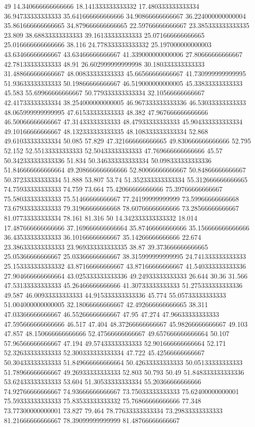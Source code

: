 49 14.340666666666666 18.141333333333332 17.480333333333334 36.94733333333333 35.641666666666666 34.90866666666667 36.224000000000004 35.861666666666665 34.879666666666665 22.59766666666667 23.385333333333335 23.809 38.68833333333333 39.16133333333333 25.071666666666665 25.016666666666666 38.116 24.778333333333332 25.197000000000003 43.63466666666667 43.63466666666667 41.339000000000006 27.80666666666667 42.78133333333333 48.91 26.602999999999998 30.180333333333333 31.488666666666667 48.00833333333333 45.66566666666667 41.730999999999995 51.93633333333333 50.19866666666667 46.519000000000005 45.33833333333333 45.583 55.69966666666667 50.779333333333334 32.10566666666667 42.41733333333334 38.254000000000005 46.967333333333336 46.53033333333333 48.065999999999995 47.61533333333333 48.382 47.967666666666666 46.50066666666667 47.31433333333333 48.47933333333333 45.904333333333334 49.10166666666667 48.132333333333335 48.108333333333334 52.868 49.61033333333334 50.085 57.829 47.321666666666665 49.830666666666666 52.795 52.152 52.55133333333333 52.50433333333333 47.769666666666666 45.57 50.342333333333336 51.834 50.346333333333334 50.098333333333336 51.846666666666664 49.208666666666666 52.80066666666667 50.84866666666667 50.37233333333334 51.888 53.807 53.74 51.352333333333334 55.312666666666665 74.75933333333333 74.759 73.664 75.42066666666666 75.39766666666667 75.58033333333333 75.51466666666667 77.24199999999999 73.59966666666668 73.67933333333333 79.31966666666668 78.60766666666666 73.28566666666667 81.07733333333334 78.161 81.316
50 14.342333333333332 18.014 17.487666666666666 37.169666666666664 35.87466666666666 35.156666666666666 36.43533333333333 36.10166666666667 35.14266666666666 22.674 23.386333333333333 23.969333333333335 38.87 39.373666666666665 25.05366666666667 25.03366666666667 38.315999999999995 24.741333333333333 25.153333333333332 43.87166666666667 43.87166666666667 41.540333333333336 27.904666666666664 43.025333333333336 49.24933333333333 26.644 30.36 31.566 47.53133333333333 45.26466666666666 41.30733333333333 51.275333333333336 49.587 46.00933333333333 44.915333333333336 45.774 55.05733333333333 51.004000000000005 32.18066666666667 42.492666666666665 38.311 47.03366666666667 46.55266666666667 47.95 47.274 47.96633333333333 47.595666666666666 46.517 47.404 48.37266666666667 45.98266666666667 49.103 47.857 48.150666666666666 52.47566666666667 49.657666666666664 50.107 57.96566666666667 47.194 49.57433333333333 52.901666666666664 52.171 52.32633333333333 52.300333333333334 47.722 45.42566666666667 50.30433333333333 51.849666666666664 50.42633333333333 50.05133333333333 51.78966666666667 49.26933333333333 52.803 50.793 50.49 51.848333333333336 53.62433333333333 53.604 51.30533333333334 55.20366666666666 74.92766666666667 74.93666666666667 73.75033333333333 75.62400000000001 75.59333333333333 75.83533333333332 75.76866666666666 77.348 73.77300000000001 73.827 79.464 78.77633333333334 73.29833333333333 81.21666666666667 78.39099999999999 81.48766666666667
